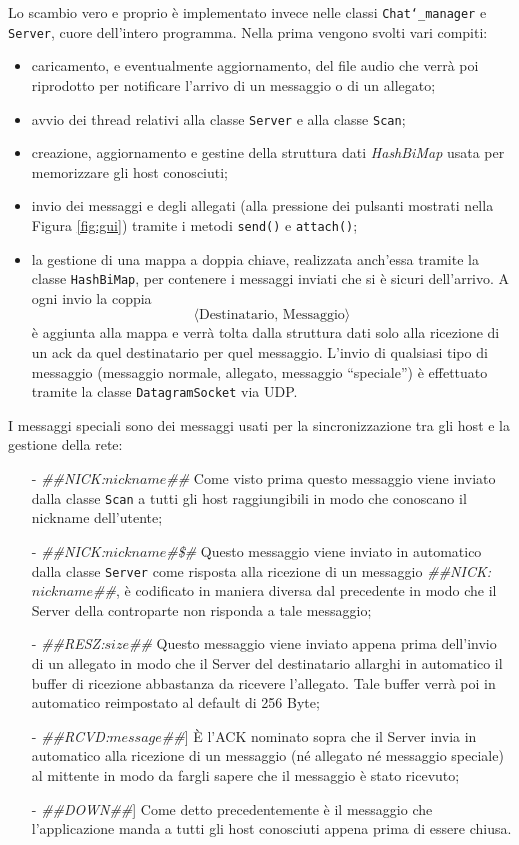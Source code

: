 Lo scambio vero e proprio è implementato invece nelle classi \texttt{Chat\char`_manager} e \texttt{Server},
cuore dell'intero programma. Nella prima vengono svolti vari compiti:
\begin{itemize}
	\item caricamento, e eventualmente aggiornamento, del file audio che verrà poi riprodotto per notificare 
	l'arrivo di un messaggio o di un allegato;
	\item avvio dei thread relativi alla classe \texttt{Server} e alla classe \texttt{Scan};
	\item creazione, aggiornamento e gestine della struttura dati \emph{HashBiMap} usata per memorizzare gli host
	conosciuti;
	\item invio dei messaggi e degli allegati (alla pressione dei pulsanti mostrati nella Figura \ref{fig:gui})
	tramite i metodi \texttt{send()} e \texttt{attach()};
	\item la gestione di una mappa a doppia chiave, realizzata anch'essa tramite la classe \texttt{HashBiMap},
	per contenere i messaggi inviati che si è sicuri dell'arrivo. A ogni invio la coppia
	$$ \langle \text{Destinatario, Messaggio} \rangle$$
	è aggiunta alla mappa e verrà tolta dalla struttura dati solo alla ricezione di un ack da quel destinatario
	per quel messaggio. L'invio di qualsiasi tipo di messaggio (messaggio normale, allegato, messaggio ``speciale'')
	è effettuato tramite la classe \texttt{DatagramSocket} via UDP.
\end{itemize}
I messaggi speciali sono dei messaggi usati per la sincronizzazione tra gli host e la gestione della rete:
\begin{itemize}
	\item[-] \emph{\#\#NICK:$nickname$\#\#} Come visto prima questo messaggio viene inviato dalla classe
	\texttt{Scan} a tutti gli host raggiungibili in modo che conoscano il nickname dell'utente;
	\item[-] \emph{\#\#NICK:$nickname$\#\$\#} Questo messaggio viene inviato in automatico dalla classe 
	\texttt{Server} come risposta alla ricezione di un messaggio \emph{\#\#NICK:$nickname$\#\#}, è codificato
	in maniera diversa dal 	precedente in modo che il Server della controparte non risponda a tale messaggio;
	\item[-] \emph{\#\#RESZ:$size$\#\#} Questo messaggio viene inviato appena prima dell'invio di un allegato in 
	modo che il Server del destinatario allarghi in automatico il buffer di ricezione abbastanza da ricevere 
	l'allegato. Tale buffer verrà poi in automatico reimpostato al default di 256 Byte;
	\item[-] \emph{\#\#RCVD:$message$\#\#}] È l'ACK nominato sopra che il Server invia in automatico alla ricezione 	
	di un messaggio (né allegato né messaggio speciale) al mittente in modo da fargli sapere che il messaggio è 
	stato ricevuto;
	\item[-] \emph{\#\#DOWN\#\#}] Come detto precedentemente è il messaggio che l'applicazione manda a tutti gli 
	host conosciuti appena prima di essere chiusa.
\end{itemize}

